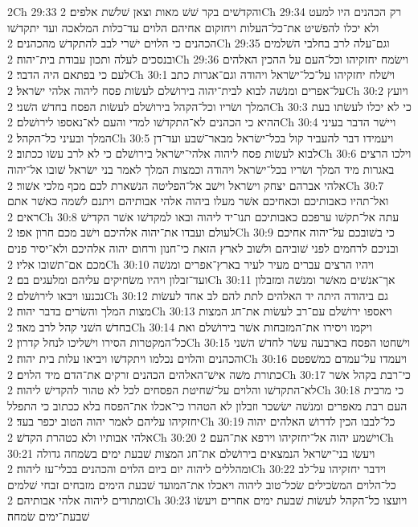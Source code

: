 2Ch 29:33  והקדשׁים בקר שׁשׁ מאות וצאן שׁלשׁת אלפים׃
2Ch 29:34  רק הכהנים היו למעט ולא יכלו להפשׁיט את־כל־העלות ויחזקום אחיהם הלוים עד־כלות המלאכה ועד יתקדשׁו הכהנים כי הלוים ישׁרי לבב להתקדשׁ מהכהנים׃
2Ch 29:35  וגם־עלה לרב בחלבי השׁלמים ובנסכים לעלה ותכון עבודת בית־יהוה׃
2Ch 29:36  וישׂמח יחזקיהו וכל־העם על ההכין האלהים לעם כי בפתאם היה הדבר׃
2Ch 30:1  וישׁלח יחזקיהו על־כל־ישׂראל ויהודה וגם־אגרות כתב על־אפרים ומנשׁה לבוא לבית־יהוה בירושׁלם לעשׂות פסח ליהוה אלהי ישׂראל׃
2Ch 30:2  ויועץ המלך ושׂריו וכל־הקהל בירושׁלם לעשׂות הפסח בחדשׁ השׁני׃
2Ch 30:3  כי לא יכלו לעשׂתו בעת ההיא כי הכהנים לא־התקדשׁו למדי והעם לא־נאספו לירושׁלם׃
2Ch 30:4  ויישׁר הדבר בעיני המלך ובעיני כל־הקהל׃
2Ch 30:5  ויעמידו דבר להעביר קול בכל־ישׂראל מבאר־שׁבע ועד־דן לבוא לעשׂות פסח ליהוה אלהי־ישׂראל בירושׁלם כי לא לרב עשׂו ככתוב׃
2Ch 30:6  וילכו הרצים באגרות מיד המלך ושׂריו בכל־ישׂראל ויהודה וכמצות המלך לאמר בני ישׂראל שׁובו אל־יהוה אלהי אברהם יצחק וישׂראל וישׁב אל־הפליטה הנשׁארת לכם מכף מלכי אשׁור׃
2Ch 30:7  ואל־תהיו כאבותיכם וכאחיכם אשׁר מעלו ביהוה אלהי אבותיהם ויתנם לשׁמה כאשׁר אתם ראים׃
2Ch 30:8  עתה אל־תקשׁו ערפכם כאבותיכם תנו־יד ליהוה ובאו למקדשׁו אשׁר הקדישׁ לעולם ועבדו את־יהוה אלהיכם וישׁב מכם חרון אפו׃
2Ch 30:9  כי בשׁובכם על־יהוה אחיכם ובניכם לרחמים לפני שׁוביהם ולשׁוב לארץ הזאת כי־חנון ורחום יהוה אלהיכם ולא־יסיר פנים מכם אם־תשׁובו אליו׃
2Ch 30:10  ויהיו הרצים עברים מעיר לעיר בארץ־אפרים ומנשׁה ועד־זבלון ויהיו משׂחיקים עליהם ומלעגים בם׃
2Ch 30:11  אך־אנשׁים מאשׁר ומנשׁה ומזבלון נכנעו ויבאו לירושׁלם׃
2Ch 30:12  גם ביהודה היתה יד האלהים לתת להם לב אחד לעשׂות מצות המלך והשׂרים בדבר יהוה׃
2Ch 30:13  ויאספו ירושׁלם עם־רב לעשׂות את־חג המצות בחדשׁ השׁני קהל לרב מאד׃
2Ch 30:14  ויקמו ויסירו את־המזבחות אשׁר בירושׁלם ואת כל־המקטרות הסירו וישׁליכו לנחל קדרון׃
2Ch 30:15  וישׁחטו הפסח בארבעה עשׂר לחדשׁ השׁני והכהנים והלוים נכלמו ויתקדשׁו ויביאו עלות בית יהוה׃
2Ch 30:16  ויעמדו על־עמדם כמשׁפטם כתורת משׁה אישׁ־האלהים הכהנים זרקים את־הדם מיד הלוים׃
2Ch 30:17  כי־רבת בקהל אשׁר לא־התקדשׁו והלוים על־שׁחיטת הפסחים לכל לא טהור להקדישׁ ליהוה׃
2Ch 30:18  כי מרבית העם רבת מאפרים ומנשׁה ישׂשכר וזבלון לא הטהרו כי־אכלו את־הפסח בלא ככתוב כי התפלל יחזקיהו עליהם לאמר יהוה הטוב יכפר בעד׃
2Ch 30:19  כל־לבבו הכין לדרושׁ האלהים יהוה אלהי אבותיו ולא כטהרת הקדשׁ׃
2Ch 30:20  וישׁמע יהוה אל־יחזקיהו וירפא את־העם׃
2Ch 30:21  ויעשׂו בני־ישׂראל הנמצאים בירושׁלם את־חג המצות שׁבעת ימים בשׂמחה גדולה ומהללים ליהוה יום ביום הלוים והכהנים בכלי־עז ליהוה׃
2Ch 30:22  וידבר יחזקיהו על־לב כל־הלוים המשׂכילים שׂכל־טוב ליהוה ויאכלו את־המועד שׁבעת הימים מזבחים זבחי שׁלמים ומתודים ליהוה אלהי אבותיהם׃
2Ch 30:23  ויועצו כל־הקהל לעשׂות שׁבעת ימים אחרים ויעשׂו שׁבעת־ימים שׂמחה׃
